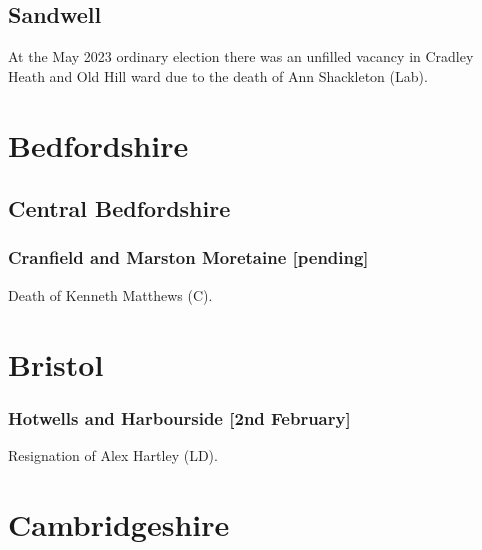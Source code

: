 \documentclass[a4paper,openany]{book}
\begin{document}
\begin{resultsiii}
\subsection*{Sandwell}

At the May 2023 ordinary election there was an unfilled vacancy in Cradley Heath and Old Hill ward due to the death of Ann Shackleton (Lab).%

\section{Bedfordshire}

\subsection*{Central Bedfordshire}

\subsubsection*{Cranfield and Marston Moretaine \hspace*{\fill}\nolinebreak[1]%
	\enspace\hspace*{\fill}
	[pending]}


Death of Kenneth Matthews (C).

\section{Bristol}

\subsubsection*{Hotwells and Harbourside \hspace*{\fill}\nolinebreak[1]%
	\enspace\hspace*{\fill}
	[2nd February]}


Resignation of Alex Hartley (LD).

\section{Cambridgeshire}


\end{resultsiii}
\end{document}
